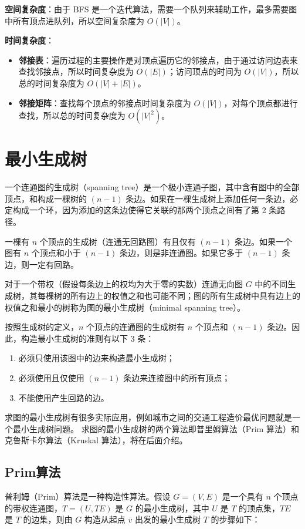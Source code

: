 \documentclass[lang=cn,newtx,10pt,scheme=chinese]{../elegantbook}
\begin{document}
\textbf{空间复杂度}：由于 BFS 是一个迭代算法，需要一个队列来辅助工作，最多需要图中所有顶点进队列，所以空间复杂度为 $O(|V|)$。

\textbf{时间复杂度}：

\begin{itemize}
  \item \textbf{邻接表}：遍历过程的主要操作是对顶点遍历它的邻接点，由于通过访问边表来查找邻接点，所以时间复杂度为 $O(|E|)$；访问顶点的时间为 $O(|V|)$，所以总的时间复杂度为 $O(|V| + |E|)$。
  \item \textbf{邻接矩阵}：查找每个顶点的邻接点时间复杂度为 $O(|V|)$，对每个顶点都进行查找，所以总的时间复杂度为 $O(|V|^2)$。
  \end{itemize}

\section{最小生成树}
一个连通图的生成树（spanning tree）是一个极小连通子图，其中含有图中的全部顶点，和构成一棵树的 $(n-1)$ 条边。如果在一棵生成树上添加任何一条边，必定构成一个环，因为添加的这条边使得它关联的那两个顶点之间有了第 2 条路径。

一棵有 $n$ 个顶点的生成树（连通无回路图）有且仅有 $(n-1)$ 条边。如果一个图有 $n$ 个顶点和小于 $(n-1)$ 条边，则是非连通图。如果它多于 $(n-1)$ 条边，则一定有回路。

对于一个带权（假设每条边上的权均为大于零的实数）连通无向图 $G$ 中的不同生成树，其每棵树的所有边上的权值之和也可能不同；图的所有生成树中具有边上的权值之和最小的树称为图的最小生成树（minimal spanning tree）。

按照生成树的定义，$n$ 个顶点的连通图的生成树有 $n$ 个顶点和 $(n-1)$ 条边。因此，构造最小生成树的准则有以下 3 条：

\begin{enumerate}
  \item 必须只使用该图中的边来构造最小生成树；
  \item 必须使用且仅使用 $(n-1)$ 条边来连接图中的所有顶点；
  \item 不能使用产生回路的边。
\end{enumerate}

求图的最小生成树有很多实际应用，例如城市之间的交通工程造价最优问题就是一个最小生成树问题。
求图的最小生成树的两个算法即普里姆算法（Prim 算法）和克鲁斯卡尔算法（Kruskal 算法），将在后面介绍。
\subsection{Prim算法}
普利姆（Prim）算法是一种构造性算法。假设 $G = (V, E)$ 是一个具有 $n$ 个顶点的带权连通图，$T = (U, TE)$ 是 $G$ 的最小生成树，其中 $U$ 是 $T$ 的顶点集，$TE$ 是 $T$ 的边集，则由 $G$ 构造从起点 $v$ 出发的最小生成树 $T$ 的步骤如下：
\end{document}
